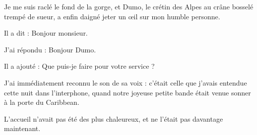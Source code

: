 \label{rat:43}%
Je me suis raclé le fond de la gorge, et Dumo, le crétin des Alpes au crâne bosselé trempé de sueur, a enfin daigné jeter un œil sur mon humble personne.

\begin{dialogue}

Il a dit : Bonjour monsieur.

J’ai répondu : Bonjour Dumo.

Il a ajouté : Que puis-je faire pour votre service ?

\end{dialogue}

J’ai immédiatement reconnu le son de sa voix : c’était celle que j’avais entendue cette nuit dans l’interphone, quand notre joyeuse petite bande était venue sonner à la porte du Caribbean.

L’accueil n’avait pas été des plus chaleureux, et ne l’était pas davantage maintenant.

